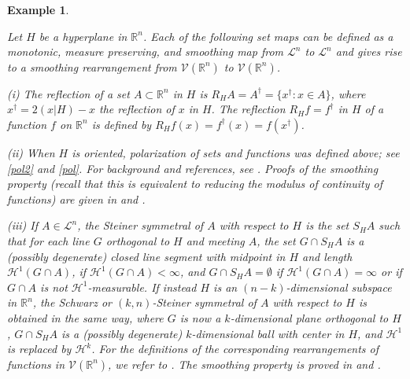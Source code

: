 \documentclass[12pt,reqno]{amsart}
\newcommand{\R}{{\mathbb R}}
\newcommand{\cL}{\mathcal L}
\newcommand{\cV}{{\mathcal V}}
\newtheorem{ex}[thm]{Example}
\numberwithin{equation}{section}
\begin{document}
\begin{ex}\label{ex429}
{\em Let $H$ be a hyperplane in $\R^n$.  Each of the following set maps can be defined as a monotonic, measure preserving, and smoothing map from $\cL^n$ to $\cL^n$ and gives rise to a smoothing rearrangement from $\cV(\R^n)$ to $\cV(\R^n)$.

(i) The {\em reflection} of a set $A\subset\R^n$ in $H$ is $R_HA=A^{\dagger}=\{x^{\dagger}: x\in A\}$, where $x^{\dagger}=2(x|H)-x$ the reflection of $x$ in $H$.  The reflection $R_Hf=f^{\dagger}$ in $H$ of a function $f$ on $\R^n$ is defined by $R_Hf(x)=f^{\dagger}(x)=f(x^{\dagger})$.

(ii) When $H$ is oriented, polarization of sets and functions was defined above; see \eqref{pol2} and \eqref{pol}.  For background and references, see \cite[p.~3]{BGGK1}. Proofs of the smoothing property (recall that this is equivalent to reducing the modulus of continuity of functions) are given in \cite[Theorem~1.37]{Baer} and \cite[Lemma~5.1]{BS}.

(iii) If $A\in {\mathcal{L}}^n$, the {\em Steiner symmetral} of $A$ with respect to $H$ is the set $S_HA$ such that for each line $G$ orthogonal to $H$ and meeting $A$, the set $G\cap S_HA$ is a (possibly degenerate) closed line segment with midpoint in $H$ and length ${\mathcal{H}}^1(G\cap A)$, if ${\mathcal{H}}^1(G\cap A)<\infty$, and $G\cap S_HA=\emptyset$ if ${\mathcal{H}}^1(G\cap A)=\infty$ or if $G\cap A$ is not ${\mathcal{H}}^1$-measurable.  If instead $H$ is an $(n-k)$-dimensional subspace in $\R^n$, the {\em Schwarz} or {\em $(k,n)$-Steiner symmetral} of $A$ with respect to $H$ is obtained in the same way, where $G$ is now a $k$-dimensional plane orthogonal to $H$, $G\cap S_HA$ is a (possibly degenerate) $k$-dimensional ball with center in $H$, and ${\mathcal{H}}^1$ is replaced by ${\mathcal{H}}^k$. For the definitions of the corresponding rearrangements of functions in ${\cV}(\R^n)$, we refer to \cite[Definition~6.2]{Baer}.  The smoothing property is proved in \cite[Theorem~6.10]{Baer} and \cite[Corollary~6.1]{BS}.

}
\end{ex}
\end{document}
